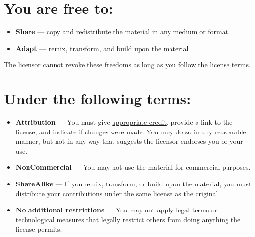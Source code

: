 \begin{tcolorbox}[
    colback=white,
    boxrule=0.5pt,
    fontupper=\scriptsize,
    before upper={\parindent0pt\setlength{\parskip}{2pt}}, %
    after upper={\vspace{-3mm}}, %
    width=\textwidth,
    top=7pt,
    bottom=7pt,
    left=4pt,
    right=4pt,
]
\section*{\scriptsize\bfseries You are free to:}
\vspace{-\baselineskip} %
\begin{itemize}[itemsep=1pt,topsep=2pt,leftmargin=18pt,partopsep=0pt]
    \item \textbf{Share} — copy and redistribute the material in any medium or format
    \item \textbf{Adapt} — remix, transform, and build upon the material
\end{itemize}

The licensor cannot revoke these freedoms as long as you follow the license terms.

\vspace{-4mm} %
\section*{\scriptsize\bfseries Under the following terms:}
\vspace{-\baselineskip} %
\begin{itemize}[itemsep=1pt,topsep=2pt,leftmargin=18pt,partopsep=0pt]
    \item \textbf{Attribution} — You must give \href{https://creativecommons.org/licenses/by/3.0/#ref-appropriate-credit}{appropriate credit}, provide a link to the license, and \href{https://creativecommons.org/licenses/by/3.0/#ref-indicate-changes}{indicate if changes were made}. You may do so in any reasonable manner, but not in any way that suggests the licensor endorses you or your use.
    \item \textbf{NonCommercial} — You may not use the material for commercial purposes.
    \item \textbf{ShareAlike} — If you remix, transform, or build upon the material, you must distribute your contributions under the same license as the original.
    \item \textbf{No additional restrictions} — You may not apply legal terms or \href{https://creativecommons.org/licenses/by/3.0/#ref-technological-measures}{technological measures} that legally restrict others from doing anything the license permits.
\end{itemize}


\end{tcolorbox}
